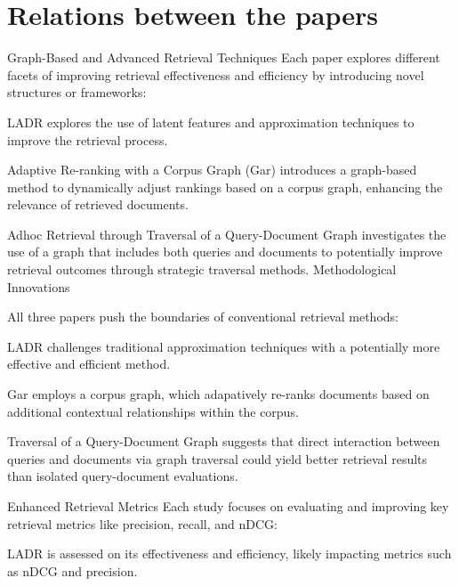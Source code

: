 \documentclass[sigconf,authorversion,nonacm]{acmart}
\begin{document}


\section{Relations between the papers}


Graph-Based and Advanced Retrieval Techniques Each paper explores different
facets of improving retrieval effectiveness and efficiency by introducing novel structures
or frameworks:

LADR explores the use of latent features and approximation techniques to improve the
retrieval process.

Adaptive Re-ranking with a Corpus Graph (Gar) introduces a graph-based method to dynamically
adjust rankings based on a corpus graph, enhancing the relevance of retrieved documents.

Adhoc Retrieval through Traversal of a Query-Document Graph investigates the use of a graph
that includes both queries and documents to potentially improve retrieval outcomes through
strategic traversal methods. Methodological Innovations

All three papers push the boundaries of conventional retrieval methods:

LADR challenges traditional approximation techniques with a potentially more effective and
efficient method.

Gar employs a corpus graph, which adapatively re-ranks documents based on additional
contextual relationships within the corpus.

Traversal of a Query-Document Graph suggests that direct interaction between queries and
documents via graph traversal could yield better retrieval results than isolated
query-document evaluations.

Enhanced Retrieval Metrics Each study focuses on evaluating and improving key retrieval
metrics like precision, recall, and nDCG:

LADR is assessed on its effectiveness and efficiency, likely impacting metrics such as nDCG
and precision.
\end{document}
